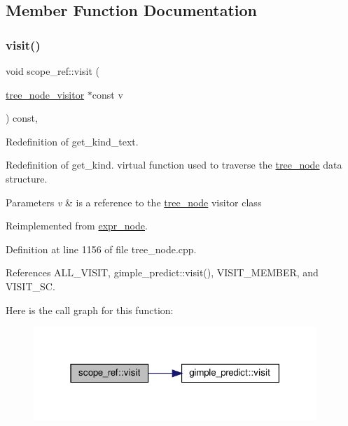 \subsection{Member Function Documentation}
\mbox{\label{structscope__ref_ab9bfdbf6812bceab436f39ea51304058}} 
\subsubsection{\texorpdfstring{visit()}{visit()}}
{\footnotesize\ttfamily void scope\+\_\+ref\+::visit (\begin{DoxyParamCaption}\item[{\hyperlink{classtree__node__visitor}{tree\+\_\+node\+\_\+visitor} $\ast$const}]{v }\end{DoxyParamCaption}) const\hspace{0.3cm}{\ttfamily [override]}, {\ttfamily [virtual]}}



Redefinition of get\+\_\+kind\+\_\+text. 

Redefinition of get\+\_\+kind. virtual function used to traverse the \hyperlink{classtree__node}{tree\+\_\+node} data structure. 
\begin{DoxyParams}{Parameters}
{\em v} & is a reference to the \hyperlink{classtree__node}{tree\+\_\+node} visitor class \\
\hline
\end{DoxyParams}


Reimplemented from \hyperlink{structexpr__node_aac767878f13ca07371dde2c3938ef38a}{expr\+\_\+node}.



Definition at line 1156 of file tree\+\_\+node.\+cpp.



References A\+L\+L\+\_\+\+V\+I\+S\+IT, gimple\+\_\+predict\+::visit(), V\+I\+S\+I\+T\+\_\+\+M\+E\+M\+B\+ER, and V\+I\+S\+I\+T\+\_\+\+SC.

Here is the call graph for this function\+:
\nopagebreak
\begin{figure}[H]
\begin{center}
\leavevmode
\includegraphics[width=303pt]{d8/db0/structscope__ref_ab9bfdbf6812bceab436f39ea51304058_cgraph}
\end{center}
\end{figure}


